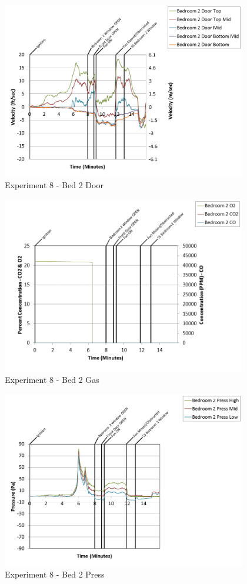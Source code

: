 \documentclass{article}
\begin{document}
\begin{appendices}
\begin{figure}[h!]
	\centering
	\includegraphics[height=3.05in]{0_Images/Results_Charts/Exp_8_Charts/Bed2Door.png}
	\caption{Experiment 8 - Bed 2 Door}
\end{figure}

\clearpage

\begin{figure}[h!]
	\centering
	\includegraphics[height=3.05in]{0_Images/Results_Charts/Exp_8_Charts/Bed2Gas.png}
	\caption{Experiment 8 - Bed 2 Gas}
\end{figure}


\begin{figure}[h!]
	\centering
	\includegraphics[height=3.05in]{0_Images/Results_Charts/Exp_8_Charts/Bed2Press.png}
	\caption{Experiment 8 - Bed 2 Press}
\end{figure}


\end{appendices}
\end{document}
